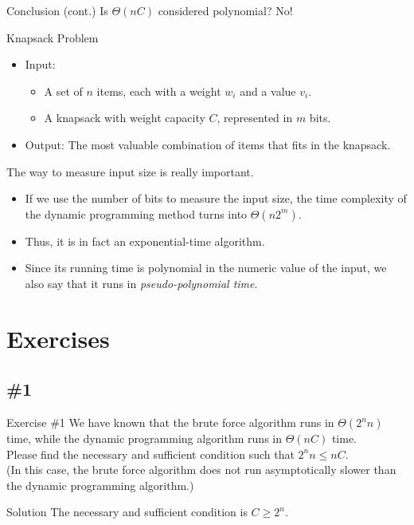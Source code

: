 \documentclass{beamer}
\begin{document}
\begin{frame}{Conclusion (cont.)}
  Is $\Theta(nC)$ considered polynomial? \pause
  No! \pause
  \begin{block}{Knapsack Problem}
    \begin{itemize}
      \item Input:
      \begin{itemize}
        \item A set of $n$ items, each with a weight $w_i$ and a value
        $v_i$.
        \item A knapsack with weight capacity $C$, represented in
        {\color{red} $m$} bits.
      \end{itemize}
      \item Output: The most valuable combination of items that fits in the
      knapsack.
    \end{itemize}
    \pause
  \end{block}
  The way to measure input size is really important. \pause
  \begin{itemize}
    \item If we use the number of bits to measure the input size, the time
    complexity of the dynamic programming method turns into
    {\color{red} $\Theta(n2^m)$}. \pause
    \item Thus, it is in fact an exponential-time algorithm. \pause
    \item Since its running time is polynomial in the numeric value of the
    input, we also say that it runs in \emph{pseudo-polynomial time}.
  \end{itemize}
\end{frame}

\section{Exercises}
\subsection{\#1}
\begin{frame}{Exercise \#1}
  We have known that the brute force algorithm runs in $\Theta(2^nn)$ time,
  while the dynamic programming algorithm runs in $\Theta(nC)$ time. \pause
  \\[1em]
  Please find the necessary and sufficient condition such that $2^nn \leq nC$.
  \\
  (In this case, the brute force algorithm does not run asymptotically slower
  than the dynamic programming algorithm.) \pause
  \begin{block}{Solution}
    The necessary and sufficient condition is $C \geq 2^n$.
  \end{block}
\end{frame}
\end{document}
